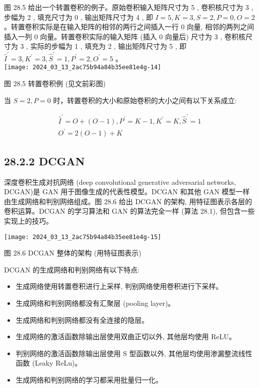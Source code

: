\documentclass[10pt]{article}
\begin{document}
图 28.5 给出一个转置卷积的例子。原始卷积输入矩阵尺寸为 5 , 卷积核尺寸为 3 , 步幅为 2 , 填充尺寸为 0 , 输出矩阵尺寸为 4 , 即 $I=5, K=3, S=2, P=0, O=2$ 。转置卷积实际是在输入矩阵的相邻的两行之间插入一行 0 向量, 相邻的两列之间插入一列 0 向量。转置卷积实际的输入矩阵 (插入 0 向量后) 尺寸为 3 , 卷积核尺寸为 3 , 实际的步幅为 1 , 填充为 2 , 输出矩阵尺寸为 5 , 即 $\hat{I}^{\prime}=3, K^{\prime}=3, \hat{S}^{\prime}=1, P^{\prime}=2, O^{\prime}=5$ 。\\
\texttt{[image: 2024\_03\_13\_2ac75b94a84b35ee81e4g-14]}

图 28.5 转置卷积例 (见文前彩图)

当 $S=2, P=0$ 时，转置卷积的大小和原始卷积的大小之间有以下关系成立:

$$
\begin{gathered}
\hat{I}^{\prime}=O+(O-1), P^{\prime}=K-1, K^{\prime}=K, \hat{S}^{\prime}=1 \\
O^{\prime}=2(O-1)+K
\end{gathered}
$$

\subsection*{28.2.2 DCGAN}
深度卷积生成对抗网络 (deep convolutional generative adversarial networks, DCGAN)是 GAN 用于图像生成的代表性模型。DCGAN 和其他 GAN 模型一样由生成网络和判别网络组成。图 28.6 给出 DCGAN 的架构, 用特征图表示各层的卷积运算。DCGAN 的学习算法和 GAN 的算法完全一样 (算法 28.1), 但包含一些实现上的技巧。

\begin{center}
\texttt{[image: 2024\_03\_13\_2ac75b94a84b35ee81e4g-15]}
\end{center}

图 28.6 DCGAN 整体的架构 (用特征图表示)

DCGAN 的生成网络和判别网络有以下特点:

\begin{itemize}
  \item 生成网络使用转置卷积进行上采样, 判别网络使用卷积进行下采样。
  \item 生成网络和判别网络都没有汇聚层 (pooling layer)。
  \item 生成网络和判别网络都没有全连接的隐层。
  \item 生成网络的激活函数除输出层使用双曲正切以外, 其他层均使用 ReLU。
  \item 判别网络的激活函数除输出层使用 $\mathrm{S}$ 型函数以外, 其他层均使用渗漏整流线性函数 (Leaky ReLu)。
  \item 生成网络和判别网络的学习都采用批量归一化。
\end{itemize}
\end{document}
